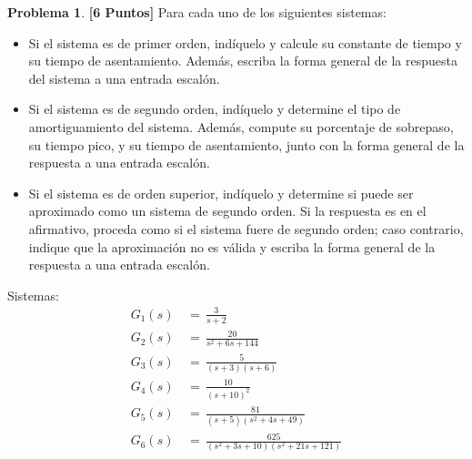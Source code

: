 \documentclass[ a4paper, twoside, 11pt]{article}
\theoremstyle{definition}
\newtheorem{problem}[definition]{Problema}
\begin{document}
\begin{problem} 
\textbf{[6 Puntos]} Para cada uno de los siguientes sistemas: 
\begin{itemize}
\item Si el sistema es de primer orden, ind\'iquelo y calcule su constante de tiempo y su tiempo de asentamiento. Adem\'as, escriba la forma general de la respuesta del sistema a una entrada escal\'on. 
\item Si el sistema es de segundo orden, ind\'iquelo y determine el tipo de amortiguamiento del sistema. Adem\'as, compute su porcentaje de sobrepaso, su tiempo pico, y su tiempo de asentamiento, junto con la forma general de la respuesta a una entrada escal\'on. 
\item Si el sistema es de orden superior, ind\'iquelo y determine si puede ser aproximado como un sistema de segundo orden. Si la respuesta es en el afirmativo, proceda como si el sistema fuere de segundo orden; caso contrario, indique que la aproximaci\'on no es v\'alida y escriba la forma general de la respuesta a una entrada escal\'on. 
\end{itemize}
Sistemas: 
\begin{align*}
G_1(s) \, 
& = \, \frac{3}{s+2} \\
G_2(s) \, 
& = \, \frac{20}{s^2 + 6s + 144} \\
G_3(s) \, 
& = \, \frac{5}{(s+3)(s+6)} \\
G_4(s) \, 
& = \, \frac{10}{(s+10)^2} \\
G_5(s) \, 
& = \, \frac{81}{( s+5 )( s^2 + 4s + 49 )} \\
G_6(s) \, 
& = \, \frac{625}{( s^2 + 3s + 10 )( s^2 + 21s + 121 )} 
\end{align*}


\end{problem}
\end{document}
